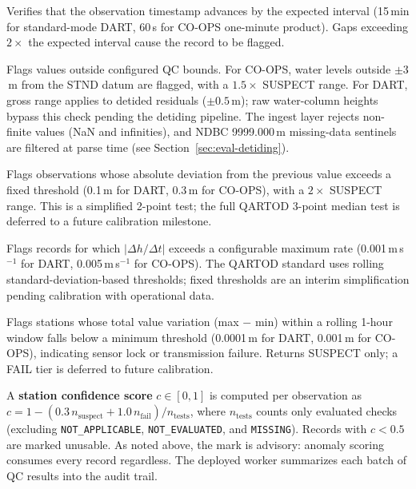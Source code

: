 \documentclass{article}
\begin{document}
\begin{description}[leftmargin=1.5em]
  \item[Timing check.] Verifies that the observation timestamp
    advances by the expected interval (15\,min for standard-mode DART,
    60\,s for CO-OPS one-minute product). Gaps exceeding $2\times$ the
    expected interval cause the record to be flagged.

  \item[Gross range check.] Flags values outside configured QC
    bounds.  For CO-OPS, water levels outside $\pm3$\,m from the STND
    datum are flagged, with a $1.5\times$ SUSPECT range.  For DART,
    gross range applies to detided residuals ($\pm0.5$\,m); raw
    water-column heights bypass this check pending the detiding
    pipeline.  The ingest layer rejects non-finite values (NaN and
    infinities), and NDBC 9999.000\,m
    missing-data sentinels are filtered at parse time
    (see Section~\ref{sec:eval-detiding}).

  \item[Spike check.] Flags observations whose absolute deviation
    from the previous value exceeds a fixed threshold (0.1\,m for
    DART, 0.3\,m for CO-OPS), with a $2\times$ SUSPECT range.  This
    is a simplified 2-point test; the full QARTOD 3-point median test
    is deferred to a future calibration milestone.

  \item[Rate-of-change check.] Flags records for which
    $|\Delta h / \Delta t|$ exceeds a configurable maximum rate
    (0.001\,m\,s$^{-1}$ for DART, 0.005\,m\,s$^{-1}$ for CO-OPS).
    The QARTOD standard uses rolling standard-deviation-based
    thresholds; fixed thresholds are an interim simplification pending
    calibration with operational data.

  \item[Flat-line check.] Flags stations whose total value variation
    (max $-$ min) within a rolling 1-hour window falls below a minimum
    threshold (0.0001\,m for DART, 0.001\,m for CO-OPS), indicating
    sensor lock or transmission failure.  Returns SUSPECT only; a FAIL
    tier is deferred to future calibration.
\end{description}

A \textbf{station confidence score} $c \in [0,1]$ is computed per
observation as $c = 1 - (0.3\, n_{\text{suspect}} + 1.0\, n_{\text{fail}})
/ n_{\text{tests}}$, where $n_{\text{tests}}$ counts only evaluated
checks (excluding \texttt{NOT\_APPLICABLE}, \texttt{NOT\_EVALUATED},
and \texttt{MISSING}).
Records with $c < 0.5$ are marked unusable. As noted above, the mark is
advisory: anomaly scoring consumes every record regardless. The
deployed worker summarizes each batch of QC results into the audit
trail.
\end{document}
